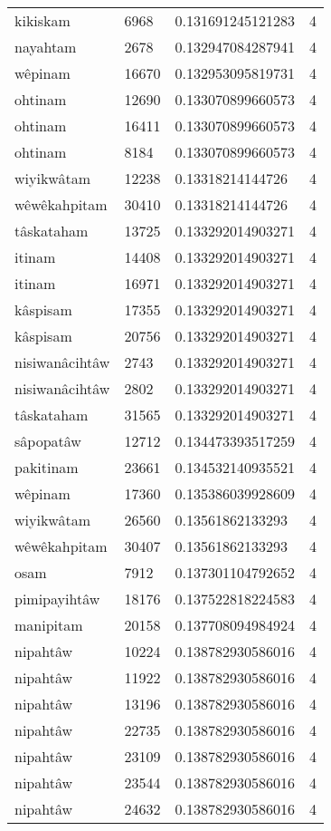 \begin{longtable}{llll}
kikiskam & 6968 & 0.131691245121283 & 4 \\
nayahtam & 2678 & 0.132947084287941 & 4 \\
wêpinam & 16670 & 0.132953095819731 & 4 \\
ohtinam & 12690 & 0.133070899660573 & 4 \\
ohtinam & 16411 & 0.133070899660573 & 4 \\
ohtinam & 8184 & 0.133070899660573 & 4 \\
wiyikwâtam & 12238 & 0.13318214144726 & 4 \\
wêwêkahpitam & 30410 & 0.13318214144726 & 4 \\
tâskataham & 13725 & 0.133292014903271 & 4 \\
itinam & 14408 & 0.133292014903271 & 4 \\
itinam & 16971 & 0.133292014903271 & 4 \\
kâspisam & 17355 & 0.133292014903271 & 4 \\
kâspisam & 20756 & 0.133292014903271 & 4 \\
nisiwanâcihtâw & 2743 & 0.133292014903271 & 4 \\
nisiwanâcihtâw & 2802 & 0.133292014903271 & 4 \\
tâskataham & 31565 & 0.133292014903271 & 4 \\
sâpopatâw & 12712 & 0.134473393517259 & 4 \\
pakitinam & 23661 & 0.134532140935521 & 4 \\
wêpinam & 17360 & 0.135386039928609 & 4 \\
wiyikwâtam & 26560 & 0.13561862133293 & 4 \\
wêwêkahpitam & 30407 & 0.13561862133293 & 4 \\
osam & 7912 & 0.137301104792652 & 4 \\
pimipayihtâw & 18176 & 0.137522818224583 & 4 \\
manipitam & 20158 & 0.137708094984924 & 4 \\
nipahtâw & 10224 & 0.138782930586016 & 4 \\
nipahtâw & 11922 & 0.138782930586016 & 4 \\
nipahtâw & 13196 & 0.138782930586016 & 4 \\
nipahtâw & 22735 & 0.138782930586016 & 4 \\
nipahtâw & 23109 & 0.138782930586016 & 4 \\
nipahtâw & 23544 & 0.138782930586016 & 4 \\
nipahtâw & 24632 & 0.138782930586016 & 4 \\

\end{longtable}

